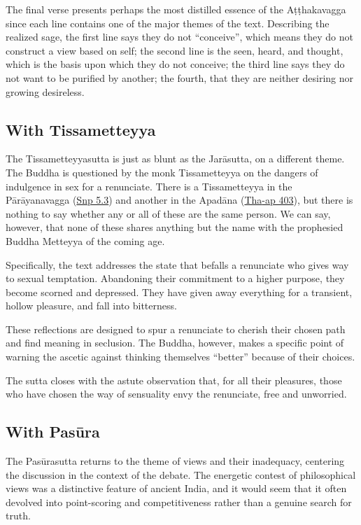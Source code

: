\documentclass[12pt,openany]{book}%
\begin{document}
The final verse presents perhaps the most distilled essence of the \textsanskrit{Aṭṭhakavagga} since each line contains one of the major themes of the text. Describing the realized sage, the first line says they do not “conceive”, which means they do not construct a view based on self; the second line is the seen, heard, and thought, which is the basis upon which they do not conceive; the third line says they do not want to be purified by another; the fourth, that they are neither desiring nor growing desireless.

\subsection*{With Tissametteyya}

The Tissametteyyasutta is just as blunt as the \textsanskrit{Jarāsutta}, on a different theme. The Buddha is questioned by the monk Tissametteyya on the dangers of indulgence in sex for a renunciate. There is a Tissametteyya in the \textsanskrit{Pārāyanavagga} (\href{https://suttacentral.net/snp5.3/en/sujato}{Snp 5.3}) and another in the \textsanskrit{Apadāna} (\href{https://suttacentral.net/tha-ap402}{Tha{-}ap 403}), but there is nothing to say whether any or all of these are the same person. We can say, however, that none of these shares anything but the name with the prophesied Buddha Metteyya of the coming age.

Specifically, the text addresses the state that befalls a renunciate who gives way to sexual temptation. Abandoning their commitment to a higher purpose, they become scorned and depressed. They have given away everything for a transient, hollow pleasure, and fall into bitterness.

These reflections are designed to spur a renunciate to cherish their chosen path and find meaning in seclusion. The Buddha, however, makes a specific point of warning the ascetic against thinking themselves “better” because of their choices.

The sutta closes with the astute observation that, for all their pleasures, those who have chosen the way of sensuality envy the renunciate, free and unworried.

\subsection*{With \textsanskrit{Pasūra}}

The \textsanskrit{Pasūrasutta} returns to the theme of views and their inadequacy, centering the discussion in the context of the debate. The energetic contest of philosophical views was a distinctive feature of ancient India, and it would seem that it often devolved into point-scoring and competitiveness rather than a genuine search for truth.
\end{document}
